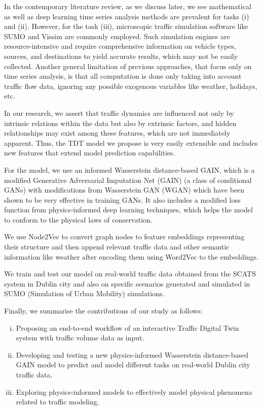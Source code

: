 \documentclass[conference]{IEEEtran}
\begin{document}
In the contemporary literature review, as we discuss later, we see mathematical as well as deep learning time series analysis methods are prevalent for tasks (i) and (ii). However, for the task (iii), microscopic traffic simulation software like SUMO\cite{sumo} and Vissim\cite{vissim} are commonly employed. Such simulation engines are resource-intensive and require comprehensive information on vehicle types, sources, and destinations to yield accurate results, which may not be easily collected. Another general limitation of previous approaches, that focus only on time series analysis, is that all computation is done only taking into account traffic flow data, ignoring any possible exogenous variables like weather\cite{weather}, holidays\cite{holiday}, etc.

In our research, we assert that traffic dynamics are influenced not only by intrinsic relations within the data but also by extrinsic factors\cite{weather}\cite{holiday}, and hidden relationships may exist among these features, which are not immediately apparent. Thus, the TDT model we propose is very easily extensible and includes new features that extend model prediction capabilities.

For the model, we use an informed Wasserstein distance-based GAIN, which is a modified Generative Adversarial Imputation Net (GAIN)\cite{gain} (a class of conditional GANs) with modifications from Wasserstein GAN (WGAN)\cite{wgan} which have been shown to be very effective in training GANs\cite{wgan}. It also includes a modified loss function from physics-informed deep learning techniques\cite{pidl}, which helps the model to conform to the physical laws of conservation. 

We use Node2Vec\cite{node2vec} to convert graph nodes to feature embeddings representing their structure and then append relevant traffic data and other semantic information like weather after encoding them using Word2Vec\cite{word2vec} to the embeddings. 

We train and test our model on real-world traffic data obtained from the SCATS\cite{scats} system in Dublin city and also on specific scenarios generated and simulated in SUMO\cite{sumo} (Simulation of Urban Mobility) simulations.

Finally, we summarise the contributions of our study as follows:
\begin{enumerate}[(i)]
  \item Proposing an end-to-end workflow of an interactive Traffic Digital Twin system with traffic volume data as input.
  \item Developing and testing a new physics-informed Wasserstein distance-based GAIN model to predict and model different tasks on real-world Dublin city traffic data.
  \item Exploring physics-informed models to effectively model physical phenomena related to traffic modeling.
\end{enumerate}
\end{document}
